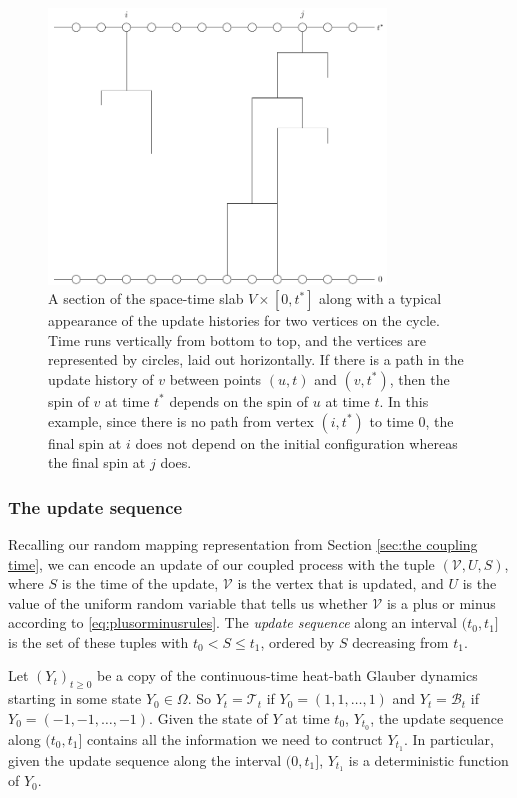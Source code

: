 	\begin{figure}
		\centering
		\includegraphics[width = 0.8\textwidth]{Figures/IsingCouplingTime/typical_percolation.pdf}
		\caption[Typical appearance of the update histories for two vertices on the cycle]{A section of the space-time slab $V \times [0, t^*]$ along with a typical appearance of the update histories for two vertices on the cycle. Time runs vertically from bottom to top, and the vertices are represented by circles, laid out horizontally. If there is a path in the update history of $v$ between points $(u, t)$ and $(v, t^*)$, then the spin of $v$ at time $t^*$ depends on the spin of $u$ at time $t$. In this example, since there is no path from vertex $(i, t^*)$ to time $0$, the final spin at $i$ does not depend on the initial configuration whereas the final spin at $j$ does.}
		\label{fig:typical percolation}
	\end{figure}

	\subsubsection{The update sequence}
	Recalling our random mapping representation from Section \ref{sec:the coupling time}, we can encode an update of our coupled process with the tuple $(\mathcal{V}, U, S)$, where $S$ is the time of the update, $\mathcal{V}$ is the vertex that is updated, and $U$ is the value of the uniform random variable that tells us whether $\mathcal{V}$ is a plus or minus according to \eqref{eq:plusorminusrules}. The \emph{update sequence} along an interval $(t_0, t_1]$ is the set of these tuples with $t_0 < S \leq t_1$, ordered by $S$ decreasing from $t_1$. 

	Let $(Y_t)_{t \geq 0}$ be a copy of the continuous-time heat-bath Glauber dynamics starting in some state $Y_0 \in \Omega$. So $Y_t = \mathscr{T}_t$ if $Y_0 = (1, 1, \dots, 1)$ and $Y_t = \mathscr{B}_t$ if $Y_0 = (-1, -1, \dots, -1)$. Given the state of $Y$ at time $t_0$, $Y_{t_0}$, the update sequence along $(t_0, t_1]$ contains all the information we need to contruct $Y_{t_1}$. In particular, given the update sequence along the interval $(0, t_1]$, $Y_{t_1}$ is a deterministic function of $Y_0$.

